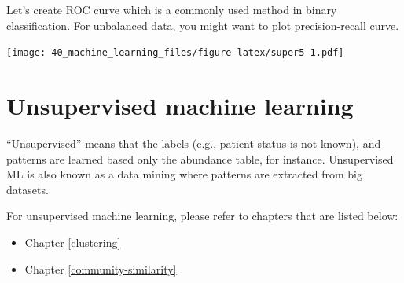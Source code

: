 \documentclass[
]{book}
\newenvironment{Shaded}{\begin{snugshade}}{\end{snugshade}}
\newcommand{\AttributeTok}[1]{\textcolor[rgb]{0.77,0.63,0.00}{#1}}
\newcommand{\CommentTok}[1]{\textcolor[rgb]{0.56,0.35,0.01}{\textit{#1}}}
\newcommand{\ConstantTok}[1]{\textcolor[rgb]{0.00,0.00,0.00}{#1}}
\newcommand{\ControlFlowTok}[1]{\textcolor[rgb]{0.13,0.29,0.53}{\textbf{#1}}}
\newcommand{\FunctionTok}[1]{\textcolor[rgb]{0.00,0.00,0.00}{#1}}
\newcommand{\NormalTok}[1]{#1}
\newcommand{\OtherTok}[1]{\textcolor[rgb]{0.56,0.35,0.01}{#1}}
\newcommand{\SpecialCharTok}[1]{\textcolor[rgb]{0.00,0.00,0.00}{#1}}
\newcommand{\StringTok}[1]{\textcolor[rgb]{0.31,0.60,0.02}{#1}}
\providecommand{\tightlist}{%
  \setlength{\itemsep}{0pt}\setlength{\parskip}{0pt}}
\begin{document}
Let's create ROC curve which is a commonly used method in binary classification.
For unbalanced data, you might want to plot precision-recall curve.

\begin{Shaded}
\end{Shaded}

\texttt{[image: 40\_machine\_learning\_files/figure-latex/super5-1.pdf]}

\hypertarget{unsupervised-machine-learning}{%
\section{Unsupervised machine learning}\label{unsupervised-machine-learning}}

``Unsupervised'' means that the labels (e.g., patient status is not known),
and patterns are learned based only the abundance table, for instance.
Unsupervised ML is also known as a data mining where patterns are extracted
from big datasets.

For unsupervised machine learning, please refer to chapters that are listed below:

\begin{itemize}
\tightlist
\item
  Chapter \ref{clustering}
\item
  Chapter \ref{community-similarity}
\end{itemize}
\end{document}
